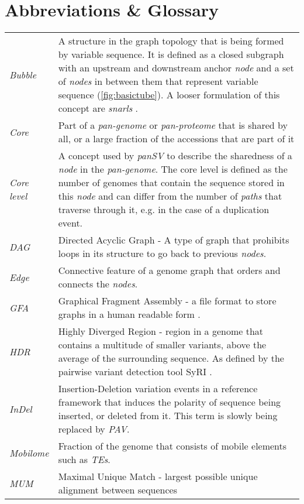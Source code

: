\chapter{Abbreviations \& Glossary}

\begin{longtable}[l]{p{}p{}}
\endhead
\endfoot
\textit{Bubble} & A structure in the graph topology that is being formed by variable sequence. It is defined as a closed subgraph with an upstream and downstream anchor \textit{node} and a set of \textit{nodes} in between them that represent variable sequence (\autoref{fig:basictube}). A looser formulation of this concept are \textit{snarls} \citep{Paten2018-qj}. \\
\textit{Core} & Part of a \textit{pan-genome} or \textit{pan-proteome} that is shared by all, or a large fraction of the accessions that are part of it \\
\textit{Core level} & A concept used by \textit{panSV} to describe the sharedness of a \textit{node} in the \textit{pan-genome}. The core level is defined as the number of genomes that contain the sequence stored in this \textit{node} and can differ from the number of \textit{paths} that traverse through it, e.g. in the case of a duplication event. \\
\textit{DAG} & Directed Acyclic Graph - A type of graph that prohibits loops in its structure to go back to previous \textit{nodes}. \\ 
\textit{Edge} & Connective feature of a genome graph that orders and connects the \textit{nodes}. \\
\textit{GFA} & Graphical Fragment Assembly - a file format to store graphs in a human readable form \citep{gfa_2021}. \\
\textit{HDR} & Highly Diverged Region - region in a genome that contains a multitude of smaller variants, above the average of the surrounding sequence. As defined by the pairwise variant detection tool SyRI \citep{Goel2019-rx}. \\
\textit{InDel} & Insertion-Deletion variation events in a reference framework that induces the polarity of sequence being inserted, or deleted from it. This term is slowly being replaced by \textit{PAV}. \\
\textit{Mobilome} & Fraction of the genome that consists of mobile elements such as \textit{TEs}. \\
\textit{MUM} & Maximal Unique Match - largest possible unique alignment between sequences \\

\end{longtable}
